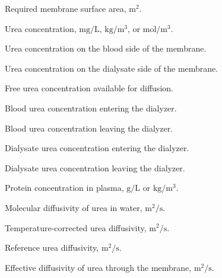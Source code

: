 \documentclass[10.5pt]{article}
\begin{document}
\vspace{-0.3cm}
\begin{description}
    \setlength\itemsep{-0.12cm}

    \item[\(A_m\)] Required membrane surface area, \(\mathrm{m^2}\).
    \item[\(C_A\)] Urea concentration, \(\mathrm{mg/L}\), \(\mathrm{kg/m^3}\), or \(\mathrm{mol/m^3}\).
    \item[\(C_{A,b}\)] Urea concentration on the blood side of the membrane.
    \item[\(C_{A,d}\)] Urea concentration on the dialysate side of the membrane.
    \item[\(C_{A,\mathrm{free}}\)] Free urea concentration available for diffusion.
    \item[\(C_{b,i}\)] Blood urea concentration entering the dialyzer.
    \item[\(C_{b,o}\)] Blood urea concentration leaving the dialyzer.
    \item[\(C_{d,i}\)] Dialysate urea concentration entering the dialyzer.
    \item[\(C_{d,o}\)] Dialysate urea concentration leaving the dialyzer.
    \item[\(C_{\mathrm{protein}}\)] Protein concentration in plasma, \(\mathrm{g/L}\) or \(\mathrm{kg/m^3}\).

    \item[\(D_{AB}\)] Molecular diffusivity of urea in water, \(\mathrm{m^2/s}\).
    \item[\(D_{AB,T}\)] Temperature-corrected urea diffusivity, \(\mathrm{m^2/s}\).
    \item[\(D_{AB,\mathrm{ref}}\)] Reference urea diffusivity, \(\mathrm{m^2/s}\).
    \item[\(D_{Ae}\)] Effective diffusivity of urea through the membrane, \(\mathrm{m^2/s}\).


\end{description}
\end{document}
